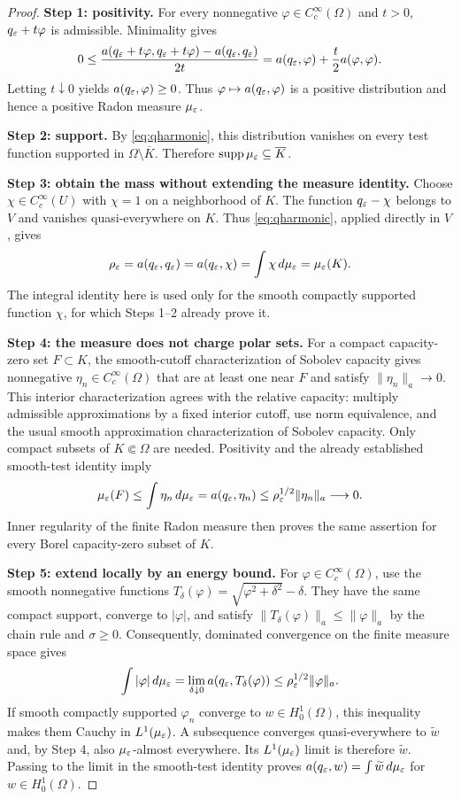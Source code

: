 \begin{proof}
\textbf{Step 1: positivity.}
For every nonnegative $\varphi\in C_c^\infty(\Omega)$ and $t>0$,
$q_\varepsilon+t\varphi$ is admissible.  Minimality gives
\begin{equation}
 0\le\frac{a(q_\varepsilon+t\varphi,q_\varepsilon+t\varphi)
               -a(q_\varepsilon,q_\varepsilon)}{2t}
 =a(q_\varepsilon,\varphi)+\frac t2a(\varphi,\varphi).
\end{equation}
Letting $t\downarrow0$ yields $a(q_\varepsilon,\varphi)\ge0$.  Thus
$\varphi\mapsto a(q_\varepsilon,\varphi)$ is a positive distribution and hence a
positive Radon measure $\mu_\varepsilon$.

\textbf{Step 2: support.}
By \cref{eq:qharmonic}, this distribution vanishes on every test function
supported in $\Omega\setminus\overline K$.  Therefore
$\operatorname{supp}\mu_\varepsilon\subseteq\overline K$.

\textbf{Step 3: obtain the mass without extending the measure identity.}
Choose $\chi\in C_c^\infty(U)$ with $\chi=1$ on a neighborhood of $K$.
The function $q_\varepsilon-\chi$ belongs to $V$ and vanishes quasi-everywhere
on $K$. Thus \cref{eq:qharmonic}, applied directly in $V$, gives
\[
 \rho_\varepsilon=a(q_\varepsilon,q_\varepsilon)=a(q_\varepsilon,\chi)
 =\int\chi\,d\mu_\varepsilon=\mu_\varepsilon(K).
\]
The integral identity here is used only for the smooth compactly supported
function $\chi$, for which Steps 1--2 already prove it.

\textbf{Step 4: the measure does not charge polar sets.}
For a compact capacity-zero set $F\subset K$, the smooth-cutoff
characterization of Sobolev capacity gives nonnegative
$\eta_n\in C_c^\infty(\Omega)$ that are at least one near $F$ and satisfy
$\|\eta_n\|_a\to0$. This interior characterization agrees with the relative
capacity: multiply admissible approximations by a fixed interior cutoff,
use norm equivalence, and the usual smooth approximation characterization
of Sobolev capacity. Only compact subsets of $K\Subset\Omega$ are needed.
Positivity and the already established smooth-test identity imply
\[
 \mu_\varepsilon(F)\le\int\eta_n\,d\mu_\varepsilon
 =a(q_\varepsilon,\eta_n)
 \le\rho_\varepsilon^{1/2}\|\eta_n\|_a\longrightarrow0.
\]
Inner regularity of the finite Radon measure then proves the same assertion
for every Borel capacity-zero subset of $K$.

\textbf{Step 5: extend locally by an energy bound.}
For $\varphi\in C_c^\infty(\Omega)$, use the smooth nonnegative functions
$T_\delta(\varphi)=\sqrt{\varphi^2+\delta^2}-\delta$.
They have the same compact support, converge to $|\varphi|$, and satisfy
$\|T_\delta(\varphi)\|_a\le\|\varphi\|_a$ by the chain rule and $\sigma\ge0$.
Consequently, dominated convergence on the finite measure space gives
\[
 \int|\varphi|\,d\mu_\varepsilon
 =\lim_{\delta\downarrow0}a(q_\varepsilon,T_\delta(\varphi))
 \le\rho_\varepsilon^{1/2}\|\varphi\|_a.
\]
If smooth compactly supported $\varphi_n$ converge to $w\in H^1_0(\Omega)$,
this inequality makes them Cauchy in $L^1(\mu_\varepsilon)$. A subsequence converges
quasi-everywhere to $\widetilde w$ and, by Step 4, also $\mu_\varepsilon$-almost
everywhere. Its $L^1(\mu_\varepsilon)$ limit is therefore $\widetilde w$.
Passing to the limit in the smooth-test identity proves
$a(q_\varepsilon,w)=\int\widetilde w\,d\mu_\varepsilon$ for $w\in H^1_0(\Omega)$.


\end{proof}
